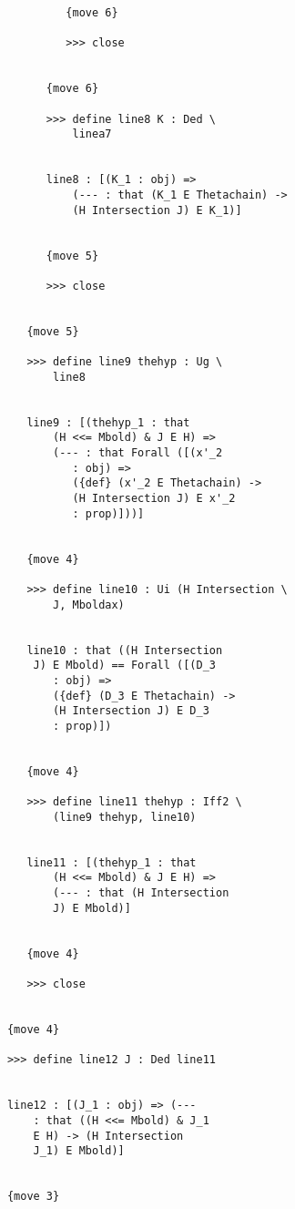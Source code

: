 \documentclass[12pt]{article}
\begin{document}
\begin{verbatim}
                     {move 6}

                     >>> close


                  {move 6}

                  >>> define line8 K : Ded \
                      linea7


                  line8 : [(K_1 : obj) => 
                      (--- : that (K_1 E Thetachain) -> 
                      (H Intersection J) E K_1)]


                  {move 5}

                  >>> close


               {move 5}

               >>> define line9 thehyp : Ug \
                   line8


               line9 : [(thehyp_1 : that 
                   (H <<= Mbold) & J E H) => 
                   (--- : that Forall ([(x'_2 
                      : obj) => 
                      ({def} (x'_2 E Thetachain) -> 
                      (H Intersection J) E x'_2 
                      : prop)]))]


               {move 4}

               >>> define line10 : Ui (H Intersection \
                   J, Mboldax)


               line10 : that ((H Intersection 
                J) E Mbold) == Forall ([(D_3 
                   : obj) => 
                   ({def} (D_3 E Thetachain) -> 
                   (H Intersection J) E D_3 
                   : prop)])


               {move 4}

               >>> define line11 thehyp : Iff2 \
                   (line9 thehyp, line10)


               line11 : [(thehyp_1 : that 
                   (H <<= Mbold) & J E H) => 
                   (--- : that (H Intersection 
                   J) E Mbold)]


               {move 4}

               >>> close


            {move 4}

            >>> define line12 J : Ded line11


            line12 : [(J_1 : obj) => (--- 
                : that ((H <<= Mbold) & J_1 
                E H) -> (H Intersection 
                J_1) E Mbold)]


            {move 3}


\end{verbatim}
\end{document}
